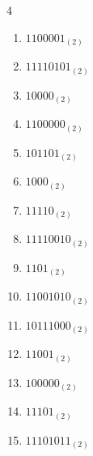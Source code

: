 \begin{multicols}{4}
\begin{enumerate}
        \phantom{$=41$}

  \item $1100001_{(2)}$

        \phantom{$=97$}

\columnbreak %

\resetques

  \item $11110101_{(2)}$

        \phantom{$=245$}

  \item $10000_{(2)}$

        \phantom{$=16$}

  \item $1100000_{(2)}$

        \phantom{$=96$}

  \item $101101_{(2)}$

        \phantom{$=45$}

  \item $1000_{(2)}$

        \phantom{$=8$}

  \item $11110_{(2)}$

        \phantom{$=30$}

  \item $11110010_{(2)}$

        \phantom{$=242$}

  \item $1101_{(2)}$

        \phantom{$=13$}

  \item $11001010_{(2)}$

        \phantom{$=202$}

  \item $10111000_{(2)}$

        \phantom{$=184$}

  \item $11001_{(2)}$

        \phantom{$=25$}

  \item $100000_{(2)}$

        \phantom{$=32$}

  \item $11101_{(2)}$

        \phantom{$=29$}

  \item $11101011_{(2)}$


\end{enumerate}
\end{multicols}
